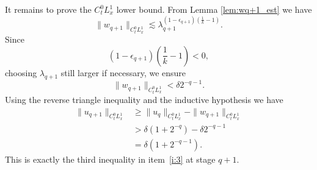 \documentclass[12pt,reqno,letterpaper]{amsart}
\numberwithin{equation}{section}
\newcommand{\1}{{\bf 1}}
\newcommand{\2}{{\bf 2}}
\theoremstyle{remark}
\theoremstyle{remark}
\begin{document}
It remains to prove the $C_t^0L^1_x$ lower bound. From Lemma \ref{lem:wq+1_est} we have
\[
\|w_{q+1}\|_{C_t^0L_x^1}
\lesssim
\lambda_{q+1}^{(1-\epsilon_{q+1})\left(\frac1k-1\right)}.
\]
Since
\[
(1-\epsilon_{q+1})\left(\frac1k-1\right)<0,
\]
choosing $\lambda_{q+1}$ still larger if necessary, we ensure
\begin{equation}\label{eq:lambda-Lone-small}
    \|w_{q+1}\|_{C_t^0L_x^1}
    <
    \delta 2^{-q-1}.
\end{equation}
Using the reverse triangle inequality and the inductive hypothesis we have
\[
\begin{aligned}
\|u_{q+1}\|_{C_t^0L_x^1}
&\ge
\|u_q\|_{C_t^0L_x^1}
-
\|w_{q+1}\|_{C_t^0L_x^1} \\
&>
\delta(1+2^{-q})
-
\delta 2^{-q-1}\\
&=
\delta(1+2^{-q-1}).
\end{aligned}
\]
This is exactly the third inequality in item~\ref{i:3} at stage $q+1$.





\end{document}
